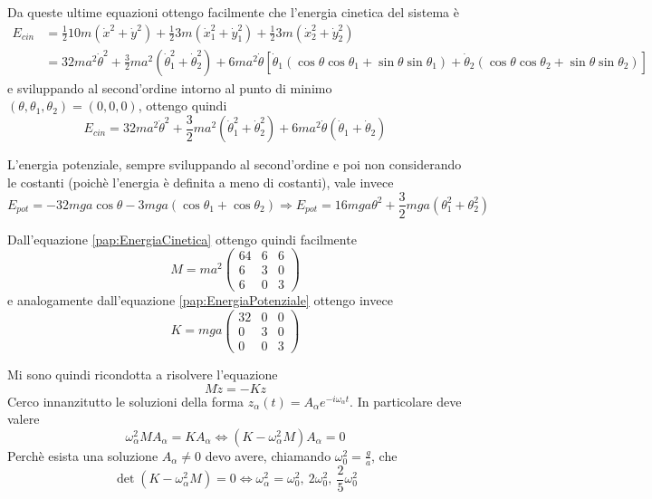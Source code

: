 \documentclass[../main.tex]{subfiles}
\begin{document}
Da queste ultime equazioni ottengo facilmente che l'energia cinetica del sistema è
\begin{equation*}
\begin{split}
	E_{cin}& =\frac 12 10 m(\dot x^2+\dot y^2)+\frac 12 3m(\dot x_1^2+\dot y_1^2)+\frac 12 3m(\dot x_2^2+\dot y_2^2)\\
	&=32ma^2\dot\theta^2+\frac 32 ma^2(\dot\theta_1^2+\dot\theta_2^2) +6ma^2\dot\theta [\dot\theta_1(\cos\theta\cos\theta_1+\sin\theta\sin\theta_1)+\dot\theta_2(\cos\theta\cos\theta_2+\sin\theta\sin\theta_2)]
\end{split}
\end{equation*}
e sviluppando al second'ordine intorno al punto di minimo $(\theta,\theta_1,\theta_2)=(0,0,0)$, ottengo quindi
\begin{equation}\label{pap:EnergiaCinetica}
	E_{cin} = 32ma^2\dot\theta^2+\frac 32 ma^2(\dot\theta_1^2+\dot\theta_2^2)+6ma^2\dot\theta(\dot\theta_1+\dot\theta_2)
\end{equation}

L'energia potenziale, sempre sviluppando al second'ordine e poi non considerando le costanti (poichè l'energia è definita a meno di costanti), vale invece
\begin{equation}\label{pap:EnergiaPotenziale}
	E_{pot}=-32mga\cos\theta-3mga(\cos\theta_1+\cos\theta_2)\Longrightarrow E_{pot}=16mga\theta^2+\frac 32 mga(\theta_1^2+\theta_2^2)
\end{equation}

Dall'equazione \cref{pap:EnergiaCinetica} ottengo quindi facilmente
\begin{equation*}
	M=ma^2
	\begin{pmatrix}
		64 & 6 & 6 \\
		6  & 3 & 0 \\
		6  & 0 & 3
	\end{pmatrix}
\end{equation*}
e analogamente dall'equazione \cref{pap:EnergiaPotenziale} ottengo invece
\begin{equation*}
	K=mga
	\begin{pmatrix}
		32 & 0 & 0 \\
		0  & 3 & 0 \\
		0  & 0 & 3
	\end{pmatrix}
\end{equation*}

Mi sono quindi ricondotta a risolvere l'equazione
\begin{equation*}
	M\ddot z=-K z
\end{equation*}
Cerco innanzitutto le soluzioni della forma $z_\alpha(t)=A_\alpha e^{-i\omega_\alpha t}$. In particolare deve valere
\begin{equation*}
	\omega_\alpha^2 M A_\alpha=KA_\alpha \iff (K-\omega_\alpha^2M)A_\alpha=0
\end{equation*}
Perchè esista una soluzione $A_\alpha\neq 0$ devo avere, chiamando $\omega_0^2=\frac ga$, che
\begin{equation*}
	\det (K-\omega_\alpha^2M) =0 \iff \omega_\alpha^2=\omega_0^2,\ 2\omega_0^2,\ \frac 25 \omega_0^2
\end{equation*}
\end{document}
